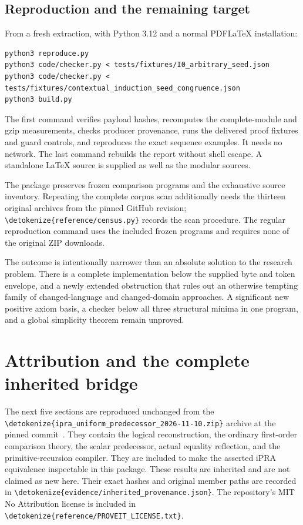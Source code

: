 \documentclass[11pt,letterpaper]{article}
\theoremstyle{definition}\newtheorem{definition}[theorem]{Definition}
\theoremstyle{remark}\newtheorem{remark}[theorem]{Remark}
\newcommand{\file}[1]{\expandafter\nolinkurl\expandafter{\detokenize{#1}}}
\begin{document}
\subsection{Reproduction and the remaining target}

From a fresh extraction, with Python 3.12 and a normal PDFLaTeX
installation:
\begin{lstlisting}
python3 reproduce.py
python3 code/checker.py < tests/fixtures/I0_arbitrary_seed.json
python3 code/checker.py < tests/fixtures/contextual_induction_seed_congruence.json
python3 build.py
\end{lstlisting}
The first command verifies payload hashes, recomputes the complete-module
and gzip measurements, checks producer provenance, runs the delivered
proof fixtures and guard controls, and reproduces the exact sequence
examples. It needs no network. The last command rebuilds the report
without shell escape. A standalone LaTeX source is supplied as well as
the modular sources.

The package preserves frozen comparison programs and the exhaustive
source inventory. Repeating the complete corpus scan additionally needs
the thirteen original archives from the pinned GitHub revision;
\file{reference/census.py} records the scan procedure. The regular
reproduction command uses the included frozen programs and requires
none of the original ZIP downloads.

The outcome is intentionally narrower than an absolute solution to the
research problem. There is a complete implementation below the supplied
byte and token envelope, and a newly extended obstruction that rules
out an otherwise tempting family of changed-language and changed-domain
approaches. A significant new positive axiom basis, a checker below all
three structural minima in one program, and a global simplicity theorem
remain unproved.



\appendix
\clearpage
\section*{Attribution and the complete inherited bridge}
The next five sections are reproduced unchanged from the
\file{ipra_uniform_predecessor_2026-11-10.zip} archive at the pinned
commit~\cite{snapshot,uniform}. They contain the logical reconstruction,
the ordinary first-order comparison theory, the scalar predecessor,
actual equality reflection, and the primitive-recursion compiler.
They are included to make the asserted iPRA equivalence inspectable in
this package. These results are inherited and are not claimed as new here.
Their exact hashes and original member paths are recorded in
\file{evidence/inherited_provenance.json}. The repository's MIT No
Attribution license is included in \file{reference/PROVEIT_LICENSE.txt}.
\end{document}
